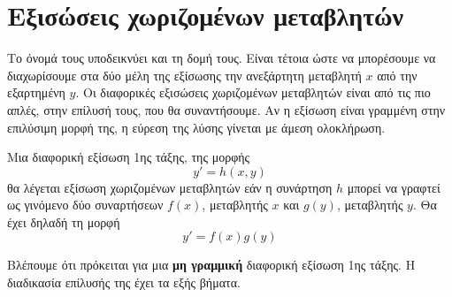 \documentclass[11pt,a4paper,twoside]{book}
\newcommand{\titlefont}[1]{{\fontfamily{maksf}\selectfont #1}}
\newcounter{orismos}[chapter]
\renewcommand{\theorismos}{\thechapter.\arabic{orismos}}
\newcommand{\orism}{\refstepcounter{orismos}{\bf\titlefont{\textcolor{maincolor}{\large{Ορισμός}\hspace{2mm}\theorismos}}}\hspace{1mm}}{}
\newenvironment{Orismos}[1]
{\begin{tcolorbox}[title=\orism:\ \  {\bf{\large\titlefont{#1}}},
breakable,
enhanced standard,
titlerule=-.2pt,
toprule=0pt, 
rightrule=0pt, 
bottomrule=0pt,
colback=white,
opacityfill=0,
left=2mm,
top=1mm,
bottom=0mm,
boxrule=0pt,
colframe=white,
borderline west={1.5mm}{0pt}{maincolor},
leftrule=2mm,
sharp corners,
coltitle=black]}
{\end{tcolorbox}}
\begin{document}
\section{Εξισώσεις χωριζομένων μεταβλητών}
Το όνομά τους υποδεικνύει και τη δομή τους. Είναι τέτοια ώστε να μπορέσουμε να διαχωρίσουμε στα δύο μέλη της εξίσωσης την ανεξάρτητη μεταβλητή $x$ από την εξαρτημένη $y$. Οι διαφορικές εξισώσεις χωριζομένων μεταβλητών είναι από τις πιο απλές, στην επίλυσή τους, που θα συναντήσουμε. Αν η εξίσωση είναι γραμμένη στην επιλύσιμη μορφή της, η εύρεση της λύσης γίνεται με άμεση ολοκλήρωση.
\begin{Orismos}{Εξίσωση χωριζομένων μεταβλητών}
Μια διαφορική εξίσωση 1ης τάξης, της μορφής
\[ y'=h(x,y) \]
θα λέγεται εξίσωση χωριζομένων μεταβλητών εάν η συνάρτηση $h$ μπορεί να γραφτεί ως γινόμενο δύο συναρτήσεων $f(x)$, μεταβλητής $x$ και $g(y)$, μεταβλητής $y$. Θα έχει δηλαδή τη μορφή
\begin{equation}\label{eq:sepvar:1}
y'=f(x)g(y)
\end{equation}
\end{Orismos}
Βλέπουμε ότι πρόκειται για μια \textbf{μη γραμμική} διαφορική εξίσωση 1ης τάξης. Η διαδικασία επίλυσής της έχει τα εξής βήματα. 
\end{document}
